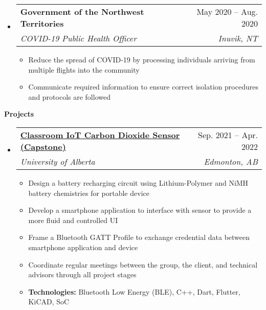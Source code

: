 \documentclass[letterpaper,12pt]{article}[leftmargin=*]
\makeatletter
\def \entryspacing {-0pt}
\renewcommand{\section}[2]{\vspace{5pt}
  \colorbox{secondary}{\color{white}\raggedbottom\normalsize\textbf{{#1}{\hspace{7pt}#2}}}
}
\newcommand{\resumeEntryStart}{\begin{itemize}[leftmargin=2.5mm]}
\newcommand{\resumeEntryEnd}{\end{itemize}\vspace{\entryspacing}}
\newcommand{\resumeItemListStart}{\begin{itemize}[leftmargin=4.5mm]}
\newcommand{\resumeItemListEnd}{\end{itemize}}
\newcommand{\resumeItem}[1]{
  \item\small{
    {#1 \vspace{-2pt}}
  }
}
\newcommand{\resumeEntryTSDL}[4]{
  \vspace{-1pt}\item[]
    \begin{tabularx}{0.97\textwidth}{X@{\hspace{60pt}}r}
      \textbf{\color{primary}#1} & {\firabook\color{accent}\small#2} \\
      \textit{\color{accent}\small#3} & \textit{\color{accent}\small#4} \\
    \end{tabularx}\vspace{-6pt}
}
\makeatother
\begin{document}
  \resumeEntryStart
  \resumeEntryTSDL
    {Government of the Northwest Territories}{May 2020 -- Aug. 2020}
    {COVID-19 Public Health Officer}{Inuvik, NT}
  \resumeItemListStart
    \resumeItem {Reduce the spread of COVID-19 by processing individuals arriving from multiple flights into the community}
    \resumeItem {Communicate required information to ensure correct isolation procedures and protocols are followed}
  \resumeItemListEnd
\resumeEntryEnd




\section{\faFlask}{Projects}

  \resumeEntryStart
    \resumeEntryTSDL
      {\href{https://github.com/EE-Team10-Capstone}{\color{black}Classroom IoT Carbon Dioxide Sensor (Capstone) \faGithub}}{Sep. 2021 -- Apr. 2022}
      {University of Alberta}{Edmonton, AB}
    \resumeItemListStart
      \resumeItem {Design a battery recharging circuit using Lithium-Polymer and NiMH battery chemistries for portable device}
      \resumeItem {Develop a smartphone application to interface with sensor to provide a more fluid and controlled UI}
      \resumeItem {Frame a Bluetooth GATT Profile to exchange credential data between smartphone application and device}
      \resumeItem {Coordinate regular meetings between the group, the client, and technical advisors through all project stages}
      \resumeItem {\textbf{Technologies:} Bluetooth Low Energy (BLE), C++, Dart, Flutter, KiCAD, SoC}
    \resumeItemListEnd
  \resumeEntryEnd
\end{document}
